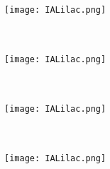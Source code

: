 \documentclass[12pt,letterpaper]{article}
\begin{document}
\begin{multicols}{2}
    \begin{minipage}[t][2in][c]{.45\textwidth}
    \centering
    \texttt{[image: IALilac.png]}\\ \vspace{.5cm}
    \huge \textbf{   }\\
    \vspace{0.5cm}
    \Large \textit{   } \\
    \vspace{0.5cm}
    \small  
    \end{minipage}
    \vspace{3cm}

    \begin{minipage}[t][2in][c]{.45\textwidth}
    \centering
    \texttt{[image: IALilac.png]}\\ \vspace{.5cm}
    \huge \textbf{   }\\
    \vspace{0.5cm}
    \Large \textit{   } \\
    \vspace{0.5cm}
    \small  
    \end{minipage}
    \vspace{3cm}

    \begin{minipage}[t][2in][c]{.45\textwidth}
    \centering
    \texttt{[image: IALilac.png]}\\ \vspace{.5cm}
    \huge \textbf{   }\\
    \vspace{0.5cm}
    \Large \textit{   } \\
    \vspace{0.5cm}
    \small  
    \end{minipage}
    \vspace{3cm}

    \begin{minipage}[t][2in][c]{.45\textwidth}
    \centering
    \texttt{[image: IALilac.png]}\\ \vspace{.5cm}
    \huge \textbf{   }\\
    \vspace{0.5cm}
    \Large \textit{   } \\
    \vspace{0.5cm}
    \small  
    \end{minipage}
    \vspace{3cm}


\end{multicols}
\end{document}
